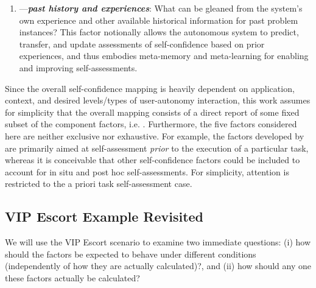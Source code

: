 \begin{enumerate}
%
\item \xP---\textit{\textbf{past history and experiences}}: What can be gleaned from the system's own experience and other available historical information for past problem instances?  
This factor notionally allows the autonomous system to predict, transfer, and update assessments of self-confidence based on prior experiences, and thus embodies meta-memory and meta-learning for enabling and improving self-assessments. 
\end{enumerate}

Since the overall self-confidence mapping is heavily dependent on application, context, and desired levels/types of user-autonomy interaction, this work assumes for simplicity that the overall mapping consists of a direct report of some fixed subset of the component factors, i.e. \xSC. 
Furthermore, the five factors considered here are neither exclusive nor exhaustive. For example, the factors developed by \cite{Aitken2016-cv, Aitken2016-fb} are primarily aimed at self-assessment \emph{prior} to the execution of a particular task, whereas it is conceivable that other self-confidence factors could be included to account for in situ and post hoc self-assessments. For simplicity, attention is restricted to the a priori task self-assessment case. 


\subsection{VIP Escort Example Revisited}

We will use the VIP Escort scenario to examine two immediate questions: (i) how should the factors be expected to behave under different conditions (independently of how they are actually calculated)?, and (ii) how should any one these factors actually be calculated?  

